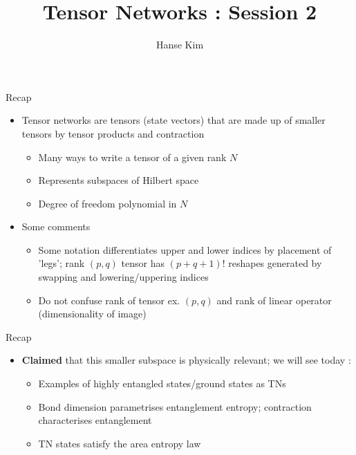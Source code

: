 \documentclass{beamer}
\title{Tensor Networks : Session 2}
\author{Hanse Kim}
\begin{document}
\begin{frame}
  \titlepage
\end{frame}

\begin{frame}{Recap}
\begin{itemize}
	\item Tensor networks are tensors (state vectors) that are made up of smaller tensors by tensor products and contraction
		\begin{itemize}
	\item Many ways to write a tensor of a given rank ${ N }$
	\item Represents subspaces of Hilbert space
	\item Degree of freedom polynomial in ${ N }$
	\end{itemize}
\item Some comments
	\begin{itemize}
	\item Some notation differentiates upper and lower indices by placement of 'legs'; rank ${ (p,q) }$ tensor has ${ (p+q+1)! }$ reshapes generated by swapping and lowering/uppering indices 
	\item Do not confuse rank of tensor ex. ${ (p,q) }$ and rank of linear operator (dimensionality of image)
	\end{itemize}
\end{itemize}
\end{frame}

\begin{frame}{Recap}
	\begin{itemize}
\item \textbf{Claimed} that this smaller subspace is physically relevant; we will see today :
	\begin{itemize}
		\item Examples of highly entangled states/ground states as TNs
	\item Bond dimension parametrises entanglement entropy; contraction characterises entanglement
	\item TN states satisfy the area entropy law 
	\end{itemize}
\end{itemize}
\end{frame}
\end{document}
